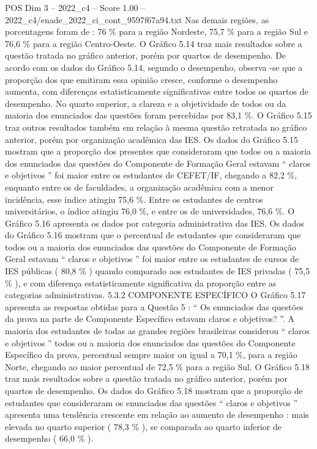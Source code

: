 \begin{textsample}{POS Dim 3 – 2022\_c4 – Score 1.00 – 2022\_c4/enade\_2022\_ci\_cont\_9597f67a94.txt}
Nas demais regiões, as porcentagens foram de : 76 \% para a região Nordeste, 75,7 \% para a região Sul e 76,6 \% para a região Centro-Oeste.
O Gráfico 5.14 traz mais resultados sobre a questão tratada no gráfico anterior, porém por quartos de desempenho.
De acordo com os dados do Gráfico 5.14, segundo o desempenho, observa -se que a proporção dos que emitiram essa opinião cresce, conforme o desempenho aumenta, com diferenças estatisticamente significativas entre todos os quartos de desempenho.
No quarto superior, a clareza e a objetividade de todos ou da maioria dos enunciados das questões foram percebidas por 83,1 \%.
O Gráfico 5.15 traz outros resultados também em relação à mesma questão retratada no gráfico anterior, porém por organização acadêmica das IES.
Os dados do Gráfico 5.15 mostram que a proporção dos presentes que consideraram que todos ou a maioria dos enunciados das questões do Componente de Formação Geral estavam “ claros e objetivos ” foi maior entre os estudantes de CEFET/IF, chegando a 82,2 \%, enquanto entre os de faculdades, a organização acadêmica com a menor incidência, esse índice atingiu 75,6 \%.
Entre os estudantes de centros universitários, o índice atingiu 76,0 \%, e entre os de universidades, 76,6 \%.
O Gráfico 5.16 apresenta os dados por categoria administrativa das IES.
Os dados do Gráfico 5.16 mostram que o percentual de estudantes que consideraram que todos ou a maioria dos enunciados das questões do Componente de Formação Geral estavam “ claros e objetivos ” foi maior entre os estudantes de cursos de IES públicas ( 80,8 \% ) quando comparado aos estudantes de IES privadas ( 75,5 \% ), e com diferença estatisticamente significativa da proporção entre as categorias administrativas. 5.3.2 COMPONENTE ESPECÍFICO O Gráfico 5.17 apresenta as respostas obtidas para a Questão 5 : “ Os enunciados das questões da prova na parte de Componente Específico estavam claros e objetivos? ”.
A maioria dos estudantes de todas as grandes regiões brasileiras considerou “ claros e objetivos ” todos ou a maioria dos enunciados das questões do Componente Específico da prova, percentual sempre maior ou igual a 70,1 \%, para a região Norte, chegando ao maior percentual de 72,5 \% para a região Sul.
O Gráfico 5.18 traz mais resultados sobre a questão tratada no gráfico anterior, porém por quartos de desempenho.
Os dados do Gráfico 5.18 mostram que a proporção de estudantes que consideraram os enunciados das questões “ claros e objetivos ” apresenta uma tendência crescente em relação ao aumento de desempenho : mais elevada no quarto superior ( 78,3 \% ), se comparada ao quarto inferior de desempenho ( 66,0 \% ).

\end{textsample}
